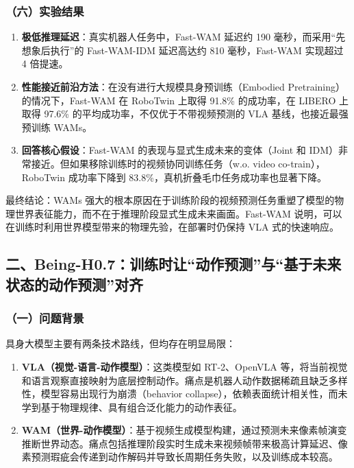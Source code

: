 \hypertarget{ux516dux5b9eux9a8cux7ed3ux679c}{%
\subsubsection{（六）实验结果}\label{ux516dux5b9eux9a8cux7ed3ux679c}}

\begin{enumerate}
\def\labelenumi{\arabic{enumi}.}
\tightlist
\item
  \textbf{极低推理延迟}：真实机器人任务中，Fast-WAM 延迟约 190 毫秒，而采用``先想象后执行''的 Fast-WAM-IDM 延迟高达约 810 毫秒，Fast-WAM 实现超过 4 倍提速。
\item
  \textbf{性能接近前沿方法}：在没有进行大规模具身预训练（Embodied Pretraining）的情况下，Fast-WAM 在 RoboTwin 上取得 91.8\% 的成功率，在 LIBERO 上取得 97.6\% 的平均成功率，不仅优于不带视频预测的 VLA 基线，也接近最强预训练 WAMs。
\item
  \textbf{回答核心假设}：Fast-WAM 的表现与显式生成未来的变体（Joint 和 IDM）非常接近。但如果移除训练时的视频协同训练任务（w.o. video co-train），RoboTwin 成功率下降到 83.8\%，真机折叠毛巾任务成功率也显著下降。
\end{enumerate}

最终结论：WAMs 强大的根本原因在于训练阶段的视频预测任务重塑了模型的物理世界表征能力，而不在于推理阶段显式生成未来画面。Fast-WAM 说明，可以在训练时利用世界模型带来的物理先验，在部署时仍保持 VLA 式的快速响应。

\hypertarget{ux4e8cbeing-h0.7ux8badux7ec3ux65f6ux8ba9ux52a8ux4f5cux9884ux6d4bux4e0eux57faux4e8eux672aux6765ux72b6ux6001ux7684ux52a8ux4f5cux9884ux6d4bux5bf9ux9f50}{%
\subsection{二、Being-H0.7：训练时让``动作预测''与``基于未来状态的动作预测''对齐}\label{ux4e8cbeing-h0.7ux8badux7ec3ux65f6ux8ba9ux52a8ux4f5cux9884ux6d4bux4e0eux57faux4e8eux672aux6765ux72b6ux6001ux7684ux52a8ux4f5cux9884ux6d4bux5bf9ux9f50}}

\hypertarget{ux4e00ux95eeux9898ux80ccux666f-22}{%
\subsubsection{（一）问题背景}\label{ux4e00ux95eeux9898ux80ccux666f-22}}

具身大模型主要有两条技术路线，但均存在明显局限：

\begin{enumerate}
\def\labelenumi{\arabic{enumi}.}
\tightlist
\item
  \textbf{VLA（视觉-语言-动作模型）}：这类模型如 RT-2、OpenVLA 等，将当前视觉和语言观察直接映射为底层控制动作。痛点是机器人动作数据稀疏且缺乏多样性，模型容易出现行为崩溃（behavior collapse），依赖表面统计相关性，而未学到基于物理规律、具有组合泛化能力的动作表征。
\item
  \textbf{WAM（世界-动作模型）}：基于视频生成模型构建，通过预测未来像素帧演变推断世界动态。痛点包括推理阶段实时生成未来视频帧带来极高计算延迟、像素预测瑕疵会传递到动作解码并导致长周期任务失败，以及训练成本较高。
\end{enumerate}

